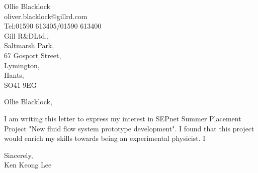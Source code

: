 \documentclass[11pt]{letter} %
\begin{document}

\begin{letter}{Ollie Blacklock\\oliver.blacklock@gillrd.com\\Tel:01590 613405/01590 613400\\Gill R\&DLtd.,\\Saltmarsh Park,\\67 Gosport Street,\\Lymington,\\Hants,\\ SO41 9EG}


\opening{Ollie Blacklock,} 

I am writing this letter to express my interest in SEPnet Summer Placement Project "New fluid flow system prototype development". I found that this project would enrich my skills towards being an experimental physicist. I 


\closing{Sincerely,\\Ken Keong Lee}




\end{letter}
\end{document}

